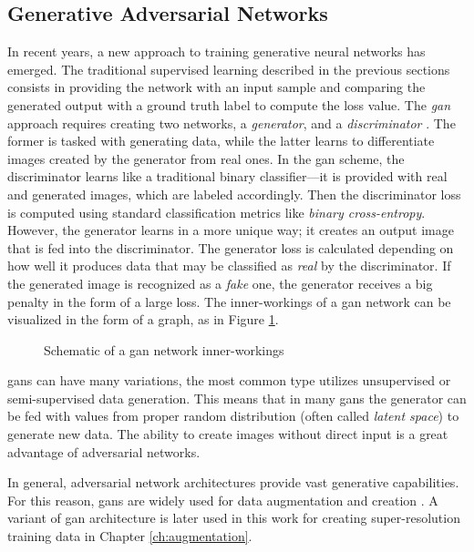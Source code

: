 \subsection{Generative Adversarial Networks}
\label{sec:gans-overview}
In recent years, a new approach to training generative neural networks has emerged.
The traditional supervised learning described in the previous sections consists in providing the network with an input sample and comparing the generated output with a ground truth label to compute the loss value.
The \textit{\gls{gan}} approach requires creating two networks, a \textit{generator}, and a \textit{discriminator} \cite{goodfellow-2014-gans}.
The former is tasked with generating data, while the latter learns to differentiate images created by the generator from real ones.
In the \gls{gan} scheme, the discriminator learns like a traditional binary classifier---it is provided with real and generated images, which are labeled accordingly.
Then the discriminator loss is computed using standard classification metrics like \textit{binary cross-entropy}.
However, the generator learns in a more unique way; it creates an output image that is fed into the discriminator.
The generator loss is calculated depending on how well it produces data that may be classified as \textit{real} by the discriminator.
If the generated image is recognized as a \textit{fake} one, the generator receives a big penalty in the form of a large loss.
The inner-workings of a \gls{gan} network can be visualized in the form of a graph, as in Figure \ref{fig:gan-training}.
\begin{figure}
    \centering
    
    \caption{Schematic of a \gls{gan} network inner-workings}
    \label{fig:gan-training}
\end{figure}

\gls{gan}s can have many variations, the most common type utilizes unsupervised or semi-supervised data generation.
This means that in many \gls{gan}s the generator can be fed with values from proper random distribution (often called \textit{latent space}) to generate new data.
The ability to create images without direct input is a great advantage of adversarial networks.

In general, adversarial network architectures provide vast generative capabilities.
For this reason, \gls{gan}s are widely used for data augmentation and creation \cite{bulat-2018-supergan, sundaram-2021-gangen, shorten-2019-augmentation, perez-2017-augmentation}.
A variant of \gls{gan} architecture is later used in this work for creating super-resolution training data in Chapter \ref{ch:augmentation}.

